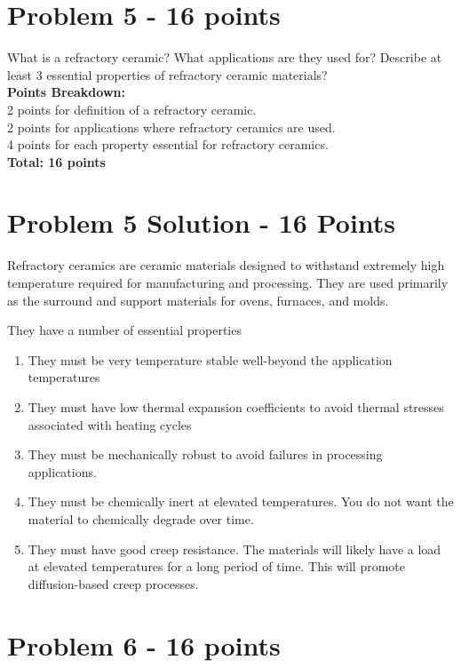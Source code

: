 \documentclass[12pt,letterpaper]{article}
\begin{document}
\newpage
\section*{Problem 5 - 16 points}

What is a refractory ceramic? What applications are they used for? Describe at least 3 essential properties of refractory ceramic materials?\\

\textbf{Points Breakdown:}\\[12pt]
2 points for definition of a refractory ceramic.\\
2 points for applications where refractory ceramics are used. \\
4 points for each property essential for refractory ceramics. \\[6 pt]
\textbf{Total: 16 points}

\section*{Problem 5 Solution - 16 Points}

Refractory ceramics are ceramic materials designed to withstand extremely high temperature required for manufacturing and processing. They are used primarily as the surround and support materials for ovens, furnaces, and molds. 

They have a number of essential properties
\begin{enumerate}
    \item They must be very temperature stable well-beyond the application temperatures
    \item They must have low thermal expansion coefficients to avoid thermal stresses associated with heating cycles
    \item They must be mechanically robust to avoid failures in processing applications. 
    \item They must be chemically inert at elevated temperatures. You do not want the material to chemically degrade over time. 
    \item They must have good creep resistance. The materials will likely have a load at elevated temperatures for a long period of time. This will promote diffusion-based creep processes.
\end{enumerate}

\newpage

\section*{Problem 6 - 16 points}
\end{document}

